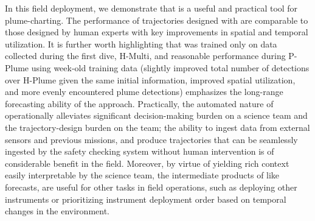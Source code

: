 In this field deployment, we demonstrate that \PHORTEX is a useful and practical tool for plume-charting. The performance of trajectories designed with \PHORTEX are comparable to those designed by human experts with key improvements in spatial and temporal utilization. It is further worth highlighting that \PHORTEX was trained only on data collected during the first dive, H-Multi, and reasonable performance during P-Plume using week-old training data (slightly improved total number of detections over H-Plume given the same initial information, improved spatial utilization, and more evenly encountered plume detections) emphasizes the long-range forecasting ability of the approach. Practically, the automated nature of \PHORTEX operationally alleviates significant decision-making burden on a science team and the trajectory-design burden on the \Sentry team; the ability to ingest data from external sensors and previous \Sentry missions, and produce trajectories that can be seamlessly ingested by the safety checking system without human intervention is of considerable benefit in the field. Moreover, by virtue of yielding rich context easily interpretable by the science team, the intermediate products of \PHORTEX like \PHUMES forecasts, are useful for other tasks in field operations, such as deploying other instruments or prioritizing instrument deployment order based on temporal changes in the environment. 



